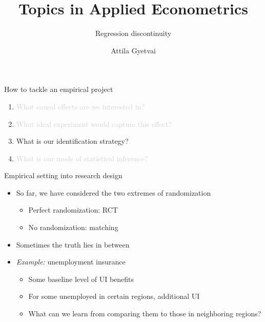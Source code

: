 \documentclass[aspectratio=169,compress,handout,t,xcolor=table]{beamer}
\title{Topics in Applied Econometrics}
\subtitle[]{Regression discontinuity}
\author[Attila Gyetvai]{Attila Gyetvai}
\institute[]{Duke Economics \\ Summer 2020}
\date{}
\begin{document}
{
\begin{frame}
  \titlepage
\end{frame}
}
\addtocounter{framenumber}{-1}

\begin{frame}[c]{How to tackle an empirical project}
  \begin{enumerate}
    \addtolength{\itemsep}{0.5\baselineskip}
    \item \textcolor{lightgray}{What causal effects are we interested in?}
    \item \textcolor{lightgray}{What ideal experiment would capture this effect?}
    \item What is our identification strategy?
    \item \textcolor{lightgray}{What is our mode of statistical inference?}
  \end{enumerate}
\end{frame}

\begin{frame}{Empirical setting into research design}
  \begin{itemize}
    \item So far, we have considered the two extremes of randomization
    \begin{itemize}
      \item Perfect randomization: RCT
      \item No randomization: matching
    \end{itemize}
    \item Sometimes the truth lies in between
    \item \emph{Example:} unemployment insurance
    \begin{itemize}
      \item Some baseline level of UI benefits
      \item For some unemployed in certain regions, additional UI
      \item What can we learn from comparing them to those in neighboring regions? 
    \end{itemize}
  \end{itemize}
\end{frame}
\end{document}
